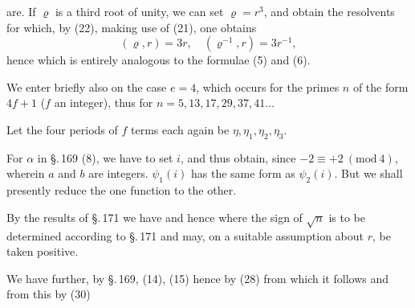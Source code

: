 are. If $\varrho$ is a third root of unity, we can set $\varrho = r^3$,
and obtain the resolvents
for which, by (22), making use of (21), one obtains
\[
(\varrho, r) = 3r, \quad (\varrho^{-1}, r) = 3r^{-1},
\]
hence
which is entirely analogous to the formulae (5) and (6).

We enter briefly also on the case $e = 4$, which occurs for
the primes $n$ of the form $4f + 1$ ($f$ an integer),
thus for $n = 5, 13, 17, 29, 37, 41 \dots$

Let the four periods of $f$ terms each again be $\eta, \eta_1, \eta_2, \eta_3$.

For $\alpha$ in \S.\,169 (8), we have to set $i$, and thus obtain,
since $-2 \equiv +2\ (\mathrm{mod}\ 4)$,
wherein $a$ and $b$ are integers. $\psi_1(i)$ has the same form
as $\psi_2(i)$. But we shall presently reduce the one function to the
other.

By the results of \S.\,171 we have
and hence
where the sign of $\sqrt{n}$ is to be determined according to \S.\,171 and
may, on a suitable assumption about $r$, be taken positive.

We have further, by \S.\,169, (14), (15)
hence by (28)
from which it follows
and from this by (30)
